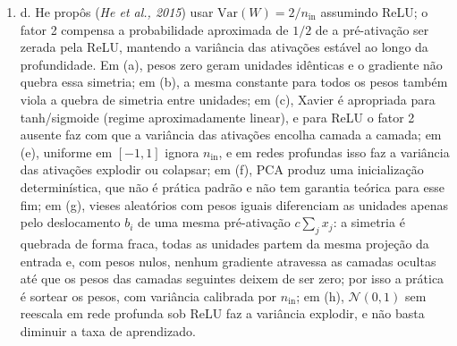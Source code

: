 \documentclass{dlproblemset}
\begin{document}
\begin{enumerate}[1)]
    \item d. He propôs (\textit{He et al., 2015}) usar $\mathrm{Var}(W) = 2/n_{\text{in}}$ assumindo ReLU; o fator 2 compensa a probabilidade aproximada de $1/2$ de a pré-ativação ser zerada pela ReLU, mantendo a variância das ativações estável ao longo da profundidade. Em (a), pesos zero geram unidades idênticas e o gradiente não quebra essa simetria; em (b), a mesma constante para todos os pesos também viola a quebra de simetria entre unidades; em (c), Xavier é apropriada para tanh/sigmoide (regime aproximadamente linear), e para ReLU o fator 2 ausente faz com que a variância das ativações encolha camada a camada; em (e), uniforme em $[-1, 1]$ ignora $n_{\text{in}}$, e em redes profundas isso faz a variância das ativações explodir ou colapsar; em (f), PCA produz uma inicialização determinística, que não é prática padrão e não tem garantia teórica para esse fim; em (g), vieses aleatórios com pesos iguais diferenciam as unidades apenas pelo deslocamento $b_i$ de uma mesma pré-ativação $c\sum_j x_j$: a simetria é quebrada de forma fraca, todas as unidades partem da mesma projeção da entrada e, com pesos nulos, nenhum gradiente atravessa as camadas ocultas até que os pesos das camadas seguintes deixem de ser zero; por isso a prática é sortear os pesos, com variância calibrada por $n_{\text{in}}$; em (h), $\mathcal{N}(0, 1)$ sem reescala em rede profunda sob ReLU faz a variância explodir, e não basta diminuir a taxa de aprendizado.


\end{enumerate}
\end{document}
